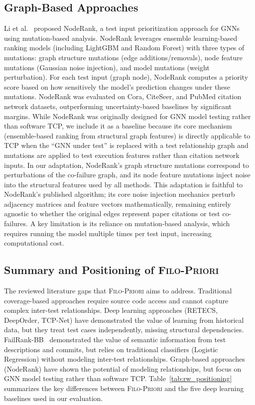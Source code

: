\documentclass[10pt,journal,compsoc]{IEEEtran}
\newcommand{\filopriori}{\textsc{Filo-Priori}}
\begin{document}
\subsection{Graph-Based Approaches}

Li et al.~\cite{li2024noderank} proposed NodeRank, a test input prioritization
approach for GNNs using mutation-based analysis. NodeRank leverages ensemble
learning-based ranking models (including LightGBM and Random Forest) with three
types of mutations: graph structure mutations (edge additions/removals), node
feature mutations (Gaussian noise injection), and model mutations (weight
perturbation). For each test input (graph node), NodeRank computes a priority score
based on how sensitively the model's prediction changes under these mutations.
NodeRank was evaluated on Cora, CiteSeer, and PubMed citation network datasets,
outperforming uncertainty-based baselines
by significant margins. While NodeRank was originally designed for GNN model
testing rather than software TCP, we include it as a baseline because its
core mechanism (ensemble-based ranking from structural graph
features) is directly applicable to TCP when the ``GNN under test'' is
replaced with a test relationship graph and mutations are applied to test
execution features rather than citation network inputs. In our adaptation,
NodeRank's graph structure mutations correspond to perturbations of the
co-failure graph, and its node feature mutations inject noise into the
structural features used by all methods. This adaptation is faithful to
NodeRank's published algorithm; its core noise injection mechanics perturb
adjacency matrices and feature vectors mathematically, remaining entirely
agnostic to whether the original edges represent paper citations or test
co-failures. A key limitation is its reliance on mutation-based
analysis, which requires running the model multiple times per test input,
increasing computational cost.

\subsection{Summary and Positioning of \filopriori{}}

The reviewed literature gaps that \filopriori{} aims to address.
Traditional coverage-based approaches require source code access and cannot
capture complex inter-test relationships. Deep learning approaches
(RETECS, DeepOrder, TCP-Net) have demonstrated the value of learning from
historical data, but they treat test cases independently, missing structural
dependencies. FailRank-BB~\cite{hernandes2025method} demonstrated the value of
semantic information from test descriptions and commits, but relies on
traditional classifiers (Logistic Regression) without modeling inter-test
relationships. Graph-based approaches (NodeRank) have shown the potential of
modeling relationships, but focus on GNN model testing rather than software TCP.
Table~\ref{tab:rw_positioning} summarizes the key differences between
\filopriori{} and the five deep learning baselines used in our evaluation.
\end{document}
